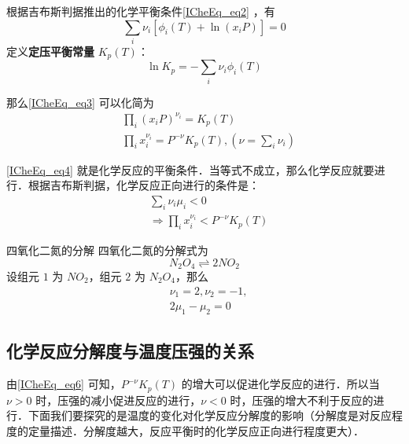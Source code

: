 根据吉布斯判据推出的化学平衡条件\autoref{ICheEq_eq2} ，有
\begin{equation}\label{ICheEq_eq3}
\sum_i\nu_i[\phi_i(T)+\ln (x_iP)]=0
\end{equation}
定义\textbf{定压平衡常量} $K_p(T)$：
\begin{equation}\label{ICheEq_eq5}
\ln K_p=-\sum_i\nu_i\phi_i(T)
\end{equation}

那么\autoref{ICheEq_eq3} 可以化简为
\begin{equation}\label{ICheEq_eq4}
\begin{aligned}
&\prod_i (x_iP)^{\nu_i}=K_p(T)\\
&\prod_i x_i^{\nu_i}=P^{-\nu} K_p(T),(\nu=\sum_i\nu_i)
\end{aligned}
\end{equation}

\autoref{ICheEq_eq4} 就是化学反应的平衡条件．当等式不成立，那么化学反应就要进行．根据吉布斯判据，化学反应正向进行的条件是：
\begin{equation}\label{ICheEq_eq6}
\begin{aligned}
&\sum_i \nu_i\mu_i<0\\
&\Rightarrow \prod_i x_i^{\nu_i}<P^{-\nu}K_p(T)
\end{aligned}
\end{equation}

\begin{example}{四氧化二氮的分解}
四氧化二氮的分解式为
\begin{equation}
N_2O_4\rightleftharpoons 2NO_2
\end{equation}
设组元 $1$ 为 $NO_2$，组元 $2$ 为 $N_2O_4$，那么
\begin{equation}
\begin{aligned}
&\nu_1=2,\nu_2=-1,\\
&2\mu_1-\mu_2=0
\end{aligned}
\end{equation}

\end{example}


\subsection{化学反应分解度与温度压强的关系}
由\autoref{ICheEq_eq6} 可知，$P^{-\nu}K_p(T)$ 的增大可以促进化学反应的进行．所以当 $\nu>0$ 时，压强的减小促进反应的进行，$\nu<0$ 时，压强的增大不利于反应的进行．下面我们要探究的是温度的变化对化学反应分解度的影响（分解度是对反应程度的定量描述．分解度越大，反应平衡时的化学反应正向进行程度更大）．

